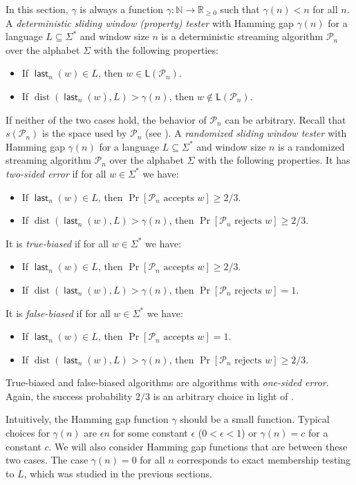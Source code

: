 \documentclass{theoretics}
\newcommand{\N}{\mathbb{N}}
\renewcommand{\P}{\mathcal{P}}
\renewcommand{\L}{\mathsf{L}}
\DeclareMathOperator{\last}{\mathsf{last}}
\DeclareMathOperator{\dist}{dist}
\renewcommand{\geq}{\geqslant}
\renewcommand{\ge}{\geq}
\begin{document}
In this section, $\gamma$ is always a function $\gamma \colon \N \to \mathbb{R}_{\geq 0}$ such that $\gamma(n) < n$ for all $n$.
A {\em deterministic sliding window (property) tester} with Hamming gap $\gamma(n)$ for a language $L \subseteq \Sigma^*$
and window size $n$  is a deterministic streaming algorithm $\P_n$
over the alphabet $\Sigma$ with the following properties:
\begin{itemize}
\item If $\last_n(w) \in L$, then $w \in \L(\P_n)$.
\item If $\dist(\last_n(w),L) > \gamma(n)$, then $w \notin \L(\P_n)$.
\end{itemize}
If neither of the two cases hold, the behavior of $\P_n$ can be arbitrary. Recall that $s(\P_n)$ is the space used by $\P_n$ (see ).
A {\em randomized sliding window tester} with Hamming gap $\gamma(n)$ for a language $L \subseteq \Sigma^*$
and window size $n$  is a randomized streaming algorithm $\P_n$
over the alphabet $\Sigma$ with the following properties.
It has {\em two-sided error} if for all $w \in \Sigma^*$ we have:
\begin{itemize}
\item If $\last_n(w) \in L$, then $\Pr[\P_n \text{ accepts } w] \ge 2/3$.
\item If $\dist(\last_n(w),L) > \gamma(n)$, then $\Pr[\P_n \text{ rejects } w] \ge 2/3$.
\end{itemize}
It is {\em true-biased} if for all $w \in \Sigma^*$ we have:
\begin{itemize}
\item If $\last_n(w) \in L$, then $\Pr[\P_n \text{ accepts } w] \ge 2/3$.
\item If $\dist(\last_n(w),L) > \gamma(n)$, then $\Pr[\P_n \text{ rejects } w] = 1$.
\end{itemize}
It is {\em false-biased} if for all $w \in \Sigma^*$ we have:
\begin{itemize}
\item If $\last_n(w) \in L$, then $\Pr[\P_n \text{ accepts } w] = 1$.
\item If $\dist(\last_n(w),L) > \gamma(n)$, then $\Pr[\P_n \text{ rejects } w] \ge 2/3$.
\end{itemize}
True-biased and false-biased algorithms are algorithms with {\em one-sided error}.
Again, the success probability $2/3$ is an arbitrary choice in light of .

Intuitively, the Hamming gap function $\gamma$ should be a small function.
Typical choices for  $\gamma(n)$ are $\epsilon n$ for some constant $\epsilon$ 
($0 < \epsilon < 1$) or $\gamma(n) = c$ for a constant $c$. We will also consider Hamming gap functions that
are between these two cases.
The case $\gamma(n) = 0$ for all $n$ corresponds to exact membership testing to $L$, which was studied in 
the previous sections.
\end{document}
